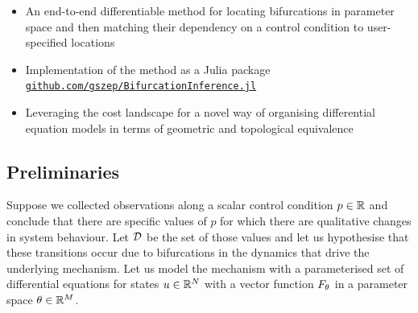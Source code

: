 \documentclass{article}
\begin{document}
\begin{itemize}
    \item An end-to-end differentiable method for locating bifurcations in parameter space and then matching their dependency on a control condition to user-specified locations
    \item Implementation of the method as a Julia package\\
\href{https://github.com/gszep/BifurcationInference.jl}{\texttt{github.com/gszep/BifurcationInference.jl}}
    \item Leveraging the cost landscape for a novel way of organising differential equation models in terms of geometric and topological equivalence
\end{itemize}

\subsection{Preliminaries}

Suppose we collected observations along a scalar control condition $p\in\mathbb{R}$ and conclude that there are specific values of $p$ for which there are qualitative changes in system behaviour. Let $\mathcal{D}$ be the set of those values and let us hypothesise that these transitions occur due to bifurcations in the dynamics that drive the underlying mechanism. Let us model the mechanism with a parameterised set of differential equations for states $u\in\mathbb{R}^N$ with a vector function $F_{\theta}$ in a parameter space $\theta\in\mathbb{R}^M$.
\end{document}
